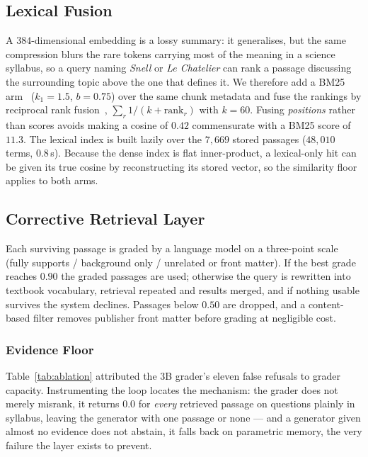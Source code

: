\documentclass[conference]{IEEEtran}
\begin{document}
\subsection{Lexical Fusion}
\label{sec:hybrid}
A $384$-dimensional embedding is a lossy summary: it generalises, but the same
compression blurs the rare tokens carrying most of the meaning in a science
syllabus, so a query naming \emph{Snell} or \emph{Le Chatelier} can rank a
passage discussing the surrounding topic above the one that defines it. We
therefore add a BM25 arm~\cite{robertson2009} ($k_1=1.5$, $b=0.75$) over the
same chunk metadata and fuse the rankings by reciprocal rank
fusion~\cite{cormack2009}, $\sum_r 1/(k + \text{rank}_r)$ with $k=60$. Fusing
\emph{positions} rather than scores avoids making a cosine of $0.42$
commensurate with a BM25 score of $11.3$. The lexical index is built lazily over
the $7{,}669$ stored passages ($48{,}010$ terms, $0.8$\,s). Because the dense
index is flat inner-product, a lexical-only hit can be given its true cosine by
reconstructing its stored vector, so the similarity floor applies to both arms.

\subsection{Corrective Retrieval Layer}
\label{sec:crag}
Each surviving passage is graded by a language model on a three-point scale
(fully supports / background only / unrelated or front matter). If the best
grade reaches $0.90$ the graded passages are used; otherwise the query is
rewritten into textbook vocabulary, retrieval repeated and results merged, and
if nothing usable survives the system declines. Passages below $0.50$ are
dropped, and a content-based filter removes publisher front matter before
grading at negligible cost.

\subsubsection{Evidence Floor}
\label{sec:floor}
Table~\ref{tab:ablation} attributed the $3$B grader's eleven false refusals to
grader capacity. Instrumenting the loop locates the mechanism: the grader does
not merely misrank, it returns $0.0$ for \emph{every} retrieved passage on
questions plainly in syllabus, leaving the generator with one passage or none
--- and a generator given almost no evidence does not abstain, it falls back on
parametric memory, the very failure the layer exists to prevent.
\end{document}
